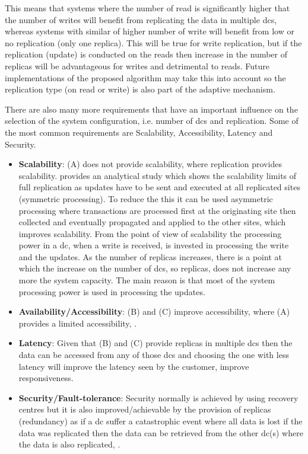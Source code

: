 \documentclass[english]{article}
\begin{document}
This means that systems where the number of read is significantly higher that the number of writes will benefit from replicating the data in multiple \glspl{dc}, whereas systems with similar of higher number of write will benefit from low or no replication (only one replica). This will be true for write replication, but if the replication (update) is conducted on the reads then increase in the number of replicas will be advantageous for writes and detrimental to reads. Future implementations of the proposed algorithm may take this into account so the replication type (on read or write) is also part of the adaptive mechanism.

There are also many more requirements that have an important influence on the selection of the system configuration, i.e. number of \glspl{dc} and replication. Some of the most common requirements are Scalability, Accessibility, Latency and Security.
\begin{itemize}
	\item {\bf Scalability}: (A) does not provide scalability, where replication provides scalability. \cite{Jimenez-Peris2003a} provides an analytical study which shows the scalability limits of full replication as updates have to be sent and executed at all replicated sites (symmetric processing). To reduce the this it can be used asymmetric processing where transactions are processed first at the originating site then collected and eventually propagated and applied to the other sites, which improves scalability. From the point of view of scalability the processing power in a \gls{dc}, when a write is received, is invested in processing the write and the updates. As the number of replicas increases, there is a point at which the increase on the number of \glspl{dc}, so replicas, does not increase any more the system capacity. The main reason is that most of the system processing power is used in processing the updates. 
	\item {\bf Availability/Accessibility}: (B) and (C) improve accessibility, where (A) provides a limited accessibility, \cite{Ladin1992a}.
	\item {\bf Latency}: Given that (B) and (C) provide replicas in multiple \glspl{dc} then the data can be accessed from any of those \glspl{dc} and choosing the one with less latency will improve the latency seen by the customer, improve responsiveness.
	\item {\bf Security/Fault-tolerance}: Security normally is achieved by using recovery centres but it is also improved/achievable by the provision of replicas (redundancy) as if a \gls{dc} suffer a catastrophic event where all data is lost if the data was replicated then the data can be retrieved from the other \gls{dc}(s) where the data is also replicated, \cite{Guerraoui1996a, Neumann1956a}.
\end{itemize}
\end{document}
